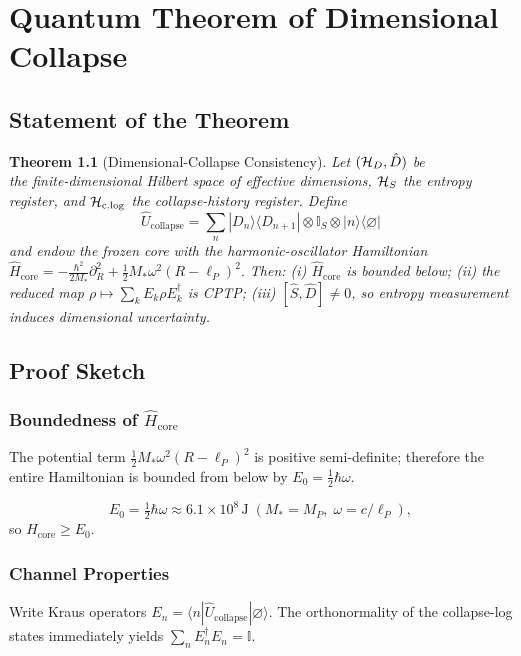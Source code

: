 \documentclass[a4paper, 12pt, oneside]{book}
\newtheorem{theorem}{Theorem}[chapter]
\numberwithin{equation}{chapter}
\begin{document}
\chapter{Quantum Theorem of Dimensional Collapse}
\label{appendix:QuantumTheorem}

\section{Statement of the Theorem}

\begin{theorem}[Dimensional-Collapse Consistency]
Let $({\cal H}_D,\hat D)$ be \\ the finite-dimensional Hilbert space of
effective dimensions, ${\cal H}_S$ the entropy register, and
${\cal H}_{\mathrm{c.log}}$ the collapse-history register.
Define
\[
 \hat U_{\mathrm{collapse}}
   =\sum_{n}|D_n\rangle\langle D_{n+1}|
            \otimes\mathbb I_S
            \otimes|n\rangle\langle\varnothing|
\]
and endow the frozen core with the harmonic-oscillator Hamiltonian
\(
 \hat H_{\mathrm{core}}
   =-\frac{\hbar^2}{2M_*}\partial_R^2
    +\frac12M_*\omega^2(R-\ell_P)^2.
\)
Then: (i) $\hat H_{\mathrm{core}}$ is bounded below; (ii) the reduced
map $\rho\mapsto\sum_kE_k\rho E_k^\dagger$ is CPTP; (iii)
$[\hat S,\hat D]\neq 0$, so entropy measurement induces dimensional
uncertainty.
\end{theorem}

\section{Proof Sketch}

\subsection{Boundedness of \texorpdfstring{$\hat H_{\mathrm{core}}$}{Hcore}}
The potential term $\tfrac12M_*\omega^{2}(R-\ell_P)^{2}$ is positive
semi-definite; therefore the entire Hamiltonian is bounded from below
by $E_0=\tfrac12\hbar\omega$.

\[
E_0=\tfrac12\hbar\omega
   \approx 6.1\times10^{8}\,\text{J}\;(M_*=M_P,\;\omega=c/\ell_P),
\]
so \(\hat H_{\mathrm{core}}\ge E_0\).

\subsection{Channel Properties}
Write Kraus operators
\(
  E_n = \langle n|\hat U_{\mathrm{collapse}}|\varnothing\rangle
\).
The orthonormality of the collapse-log states
immediately yields $\sum_nE_n^{\dagger}E_n=\mathbb I$.
\end{document}
